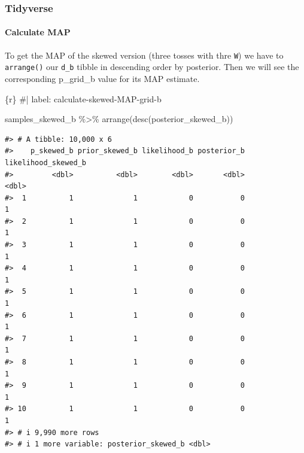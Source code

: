 \documentclass[
  letterpaper,
  DIV=11,
  numbers=noendperiod]{scrreprt}
\let\oldparagraph\paragraph
\renewcommand{\paragraph}[1]{\oldparagraph{#1}\mbox{}}
\newenvironment{Shaded}{\begin{snugshade}}{\end{snugshade}}
\newcommand{\CommentTok}[1]{\textcolor[rgb]{0.37,0.37,0.37}{#1}}
\newcommand{\FunctionTok}[1]{\textcolor[rgb]{0.28,0.35,0.67}{#1}}
\newcommand{\InformationTok}[1]{\textcolor[rgb]{0.37,0.37,0.37}{#1}}
\newcommand{\NormalTok}[1]{\textcolor[rgb]{0.00,0.23,0.31}{#1}}
\newcommand{\SpecialCharTok}[1]{\textcolor[rgb]{0.37,0.37,0.37}{#1}}
\begin{document}
\hypertarget{tidyverse-13}{%
\subsubsection{Tidyverse}\label{tidyverse-13}}

\hypertarget{calculate-map}{%
\paragraph{Calculate MAP}\label{calculate-map}}

To get the MAP of the skewed version (three tosses with thre \texttt{W})
we have to \texttt{arrange()} our \texttt{d\_b} tibble in descending
order by posterior. Then we will see the corresponding p\_grid\_b value
for its MAP estimate.

\begin{Shaded}
\begin{Highlighting}[]
\InformationTok{\textasciigrave{}\textasciigrave{}\textasciigrave{}\{r\}}
\CommentTok{\#| label: calculate{-}skewed{-}MAP{-}grid{-}b}

\NormalTok{samples\_skewed\_b }\SpecialCharTok{\%\textgreater{}\%} 
  \FunctionTok{arrange}\NormalTok{(}\FunctionTok{desc}\NormalTok{(posterior\_skewed\_b))}
\InformationTok{\textasciigrave{}\textasciigrave{}\textasciigrave{}}
\end{Highlighting}
\end{Shaded}

\begin{verbatim}
#> # A tibble: 10,000 x 6
#>    p_skewed_b prior_skewed_b likelihood_b posterior_b likelihood_skewed_b
#>         <dbl>          <dbl>        <dbl>       <dbl>               <dbl>
#>  1          1              1            0           0                   1
#>  2          1              1            0           0                   1
#>  3          1              1            0           0                   1
#>  4          1              1            0           0                   1
#>  5          1              1            0           0                   1
#>  6          1              1            0           0                   1
#>  7          1              1            0           0                   1
#>  8          1              1            0           0                   1
#>  9          1              1            0           0                   1
#> 10          1              1            0           0                   1
#> # i 9,990 more rows
#> # i 1 more variable: posterior_skewed_b <dbl>
\end{verbatim}
\end{document}
